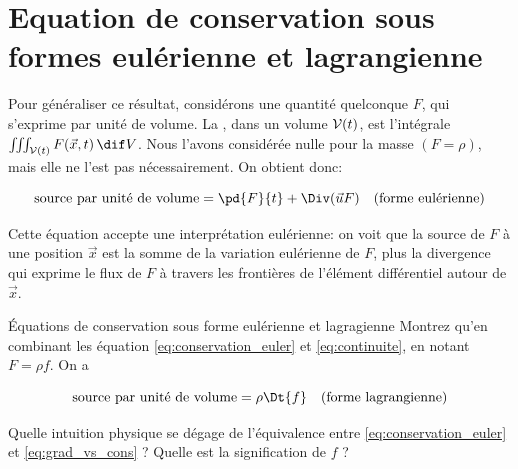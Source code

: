 \section{Equation de conservation sous formes eulérienne et lagrangienne}

Pour généraliser ce résultat, considérons une quantité  quelconque $F$, qui s'exprime par unité de volume. La , dans un volume $\mathcal{V}(t)$, est l'intégrale $\iiint_{\vol(t)} F(\vec{x},t)\,\dif V$. Nous l'avons considérée nulle pour la masse $(F=\rho)$, mais elle ne l'est pas nécessairement. On obtient donc: 


\begin{equation}
\text{source par unit\'e de volume} = \pd{F}{t} + \Div(\vec{u}F) \quad  (\textrm{forme eulérienne})
\label{eq:conservation_euler}
\end{equation}

Cette équation accepte une interprétation eulérienne: on voit que la source de $F$ à une position $\vec{x}$ est la somme de la variation eulérienne de $F$, plus la divergence qui exprime le flux de $F$ à travers les frontières de l'élément différentiel autour de $\vec{x}$. 

\begin{studentinvestigation}{Équations de conservation sous forme eulérienne et lagragienne}
  Montrez qu'en combinant les équation \eqref{eq:conservation_euler} et \eqref{eq:continuite}, en notant $F=\rho f$. On a 

\begin{equation}
  \text{source par unité de volume} = \rho \Dt{f}                 \quad \textrm{(forme lagrangienne)} 
  \label{eq:grad_vs_cons}
\end{equation}

Quelle intuition physique se dégage de l'équivalence entre \eqref{eq:conservation_euler} et \eqref{eq:grad_vs_cons} ? Quelle est la signification de $f$ ? 
\end{studentinvestigation}


